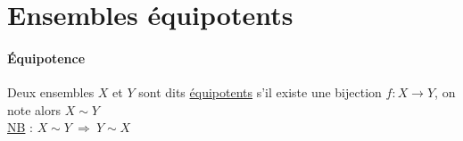 

\minitoc
	\section{Ensembles équipotents}
		\traitd
		\paragraph{Équipotence}
			Deux ensembles $X$ et $Y$ sont dits \uline{équipotents} s'il existe une bijection $f:X\to Y$, on note alors $X\sim Y$ \trait
		\vspace*{-1.1cm} \\ \uline{NB} : $X\sim Y ~\Rightarrow ~Y\sim X$
		\vspace*{0.5cm} \\  \newpage \traitd
